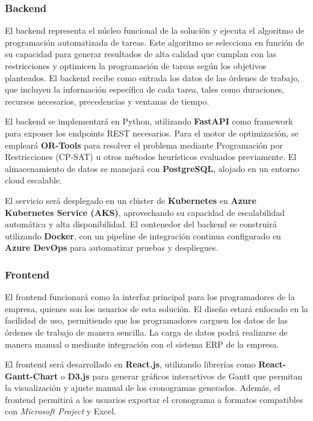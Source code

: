 \documentclass{article}
\begin{document}
\subsubsection{Backend}

El backend representa el núcleo funcional de la solución y ejecuta el algoritmo de programación automatizada de tareas. Este algoritmo se selecciona en función de su capacidad para generar resultados de alta calidad que cumplan con las restricciones y optimicen la programación de tareas según los objetivos planteados. El backend recibe como entrada los datos de las órdenes de trabajo, que incluyen la información específica de cada tarea, tales como duraciones, recursos necesarios, precedencias y ventanas de tiempo.

El backend se implementará en Python, utilizando \textbf{FastAPI} como framework para exponer los endpoints REST necesarios. Para el motor de optimización, se empleará \textbf{OR-Tools} para resolver el problema mediante Programación por Restricciones (CP-SAT) u otros métodos heurísticos evaluados previamente. El almacenamiento de datos se manejará con \textbf{PostgreSQL}, alojado en un entorno cloud escalable.

El servicio será desplegado en un clúster de \textbf{Kubernetes} en \textbf{Azure Kubernetes Service (AKS)}, aprovechando su capacidad de escalabilidad automática y alta disponibilidad. El contenedor del backend se construirá utilizando \textbf{Docker}, con un pipeline de integración continua configurado en \textbf{Azure DevOps} para automatizar pruebas y despliegues.

\subsubsection{Frontend}

El frontend funcionará como la interfaz principal para los programadores de la empresa, quienes son los usuarios de esta solución. El diseño estará enfocado en la facilidad de uso, permitiendo que los programadores carguen los datos de las órdenes de trabajo de manera sencilla. La carga de datos podrá realizarse de manera manual o mediante integración con el sistema ERP de la empresa.

El frontend será desarrollado en \textbf{React.js}, utilizando librerías como \textbf{React-Gantt-Chart} o \textbf{D3.js} para generar gráficos interactivos de Gantt que permitan la visualización y ajuste manual de los cronogramas generados. Además, el frontend permitirá a los usuarios exportar el cronograma a formatos compatibles con \textit{Microsoft Project} y Excel.
\end{document}

